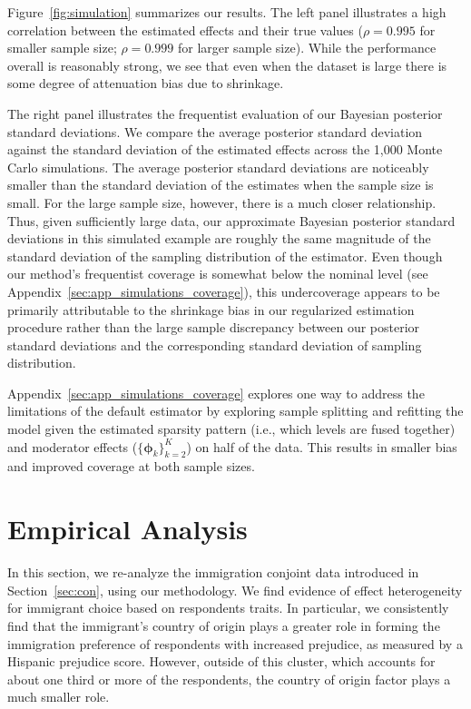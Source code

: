 Figure~\ref{fig:simulation} summarizes our results. The left panel
illustrates a high correlation between the estimated effects and their true values ($\rho = 0.995$ for smaller sample size; $\rho = 0.999$ for larger sample size). While the performance overall is reasonably strong, we see that even when the dataset is large there is some degree of attenuation bias due to shrinkage.

The right panel illustrates the frequentist evaluation of our Bayesian
posterior standard deviations.  We compare the average posterior
standard deviation against the standard deviation of the estimated
effects across the 1,000 Monte Carlo simulations.  The average
posterior standard deviations are noticeably smaller than the standard
deviation of the estimates when the sample size is small.  For the
large sample size, however, there is a much closer relationship.
Thus, given sufficiently large data, our approximate Bayesian
posterior standard deviations in this simulated example are roughly
the same magnitude of the standard deviation of the sampling
distribution of the estimator. Even though our method's frequentist
coverage is somewhat below the nominal level (see
Appendix~\ref{sec:app_simulations_coverage}), this undercoverage
appears to be primarily attributable to the shrinkage bias in our
regularized estimation procedure rather than the large sample
discrepancy between our posterior standard deviations and the
corresponding standard deviation of sampling distribution.

Appendix~\ref{sec:app_simulations_coverage} explores one way to
address the limitations of the default estimator by exploring sample
splitting and refitting the model given the estimated sparsity pattern
(i.e., which levels are fused together) and moderator effects
($\{\bm{\phi}_k\}_{k=2}^K$) on half of the data. This results in
smaller bias and improved coverage at both sample sizes. 

\section{Empirical Analysis}\label{sec:analysis}

In this section, we re-analyze the immigration conjoint data
introduced in Section~\ref{sec:con}, using our methodology.  We find
evidence of effect heterogeneity for immigrant choice based on
respondents traits.  In particular, we consistently find that the
immigrant's country of origin plays a greater role in forming the
immigration preference of respondents with increased prejudice, as
measured by a Hispanic prejudice score.  However, outside of this
cluster, which accounts for about one third or more of the
respondents, the country of origin factor plays a much smaller role. 

